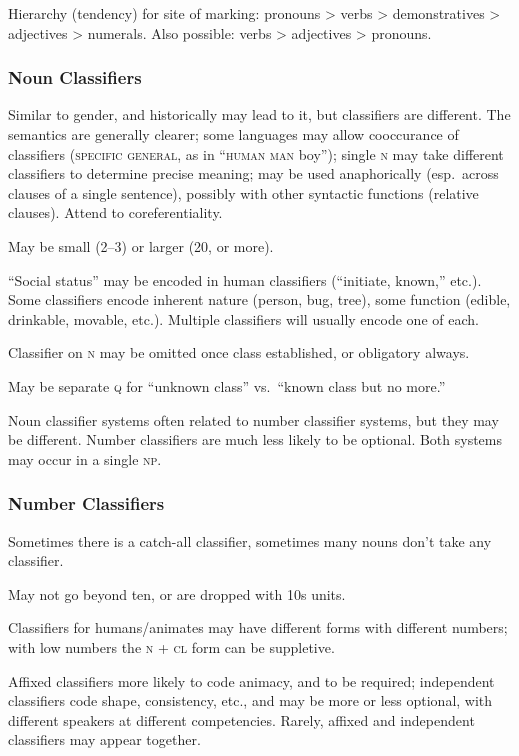 \documentclass[11pt]{article}
\newcommand{\I}[1]{\textsc{#1}}   %
\begin{document}
Hierarchy (tendency) for site of marking: pronouns > verbs >
demonstratives > adjectives > numerals. Also possible: verbs >
adjectives > pronouns.

\subsubsection{Noun Classifiers}
Similar to gender, and historically may lead to it, but classifiers
are different.  The semantics are generally clearer; some languages
may allow cooccurance of classifiers (\I{specific general}, as in
``\I{human man} boy''); single \I{n} may take different classifiers to
determine precise meaning; may be used anaphorically (esp.\ across
clauses of a single sentence), possibly with other syntactic functions
(relative clauses).  Attend to coreferentiality.

May be small (2--3) or larger (20, or more).

``Social status'' may be encoded in human classifiers (``initiate,
known,'' etc.).  Some classifiers encode inherent nature (person, bug,
tree), some function (edible, drinkable, movable, etc.).  Multiple
classifiers will usually encode one of each.

Classifier on \I{n} may be omitted once class established, or
obligatory always.

May be separate \I{q} for ``unknown class'' vs.\ ``known class but no
more.'' 

Noun classifier systems often related to number classifier systems,
but they may be different.  Number classifiers are much less likely to
be optional.  Both systems may occur in a single \I{np}.

\subsubsection{Number Classifiers}
Sometimes there is a catch-all classifier, sometimes many nouns don't
take any classifier.

May not go beyond ten, or are dropped with 10s units.

Classifiers for humans/animates may have different forms with
different numbers; with low numbers the \I{n + cl} form can be
suppletive.

Affixed classifiers more likely to code animacy, and to be required;
independent classifiers code shape, consistency, etc., and may be more
or less optional, with different speakers at different competencies.
Rarely, affixed and independent classifiers may appear together.
\end{document}
